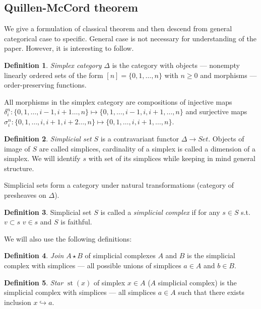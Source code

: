 \documentclass[a4paper, 12pt]{article}
\theoremstyle{definition}
\newtheorem{definition}{Definition}
\theoremstyle{remark}
\newcommand{\define}[1]{{\textit{#1}}}
\begin{document}
\subsection{Quillen-McCord theorem}

We give a formulation of classical theorem and then descend from general categorical case to specific. General case is not necessary for understanding of the paper. However, it is interesting to follow.\\

\begin{definition}
  \define{Simplex category} $\Delta$ is the category with objects --- nonempty linearly ordered sets of the form $[n] = \{0,1,\ldots,n\}$ with $n \geq 0$ and morphisms --- order-preserving functions.
\end{definition}

All morphisms in the simplex category are compositions of injective maps $\delta_i^n : \{0,1,\ldots,i-1,i+1\ldots,n\} \mapsto \{0,1,\ldots,i-1,i,i+1,\ldots,n\}$ and surjective maps $\sigma^n_i : \{0,1,\ldots,i,i+1,i+2\ldots,n\} \mapsto \{0,1,\ldots,i,i+1,\ldots,n\}$.

\begin{definition}
  \define{Simplicial set} $S$ is a contravariant functor $\Delta \to Set$. Objects of image of $S$ are called simplices, cardinality of a simplex is called a dimension of a simplex. We will identify $s$ with set of its simplices while keeping in mind general structure.
\end{definition}

Simplicial sets form a category under natural transformations (category of presheaves on $\Delta$).\\

\begin{definition}
  Simplicial set $S$ is called a \define{simplicial complex} if for any $s \in S$ s.t. $v \subset s$  $v \in s$ and $S$ is faithful.
\end{definition}

We will also use the following definitions:

\begin{definition}
  \define{Join} $A \star B$ of simplicial complexes $A$ and $B$ is the simplicial complex with simplices --- all possible unions of simplices $a \in A$ and $b \in B$.
\end{definition}

\begin{definition}
  \define{Star} $\operatorname{st}(x)$ of simplex $x \in A$ ($A$ simplicial complex) is the simplicial complex with simplices --- all simplices $a \in A$ such that there exists inclusion $x \hookrightarrow a$.
\end{definition}
\end{document}
